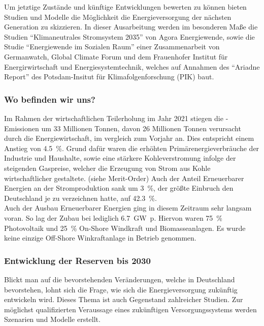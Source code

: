 		Um jetztige Zustände und künftige Entwicklungen bewerten zu können bieten Studien und Modelle die Möglichkeit die Energieversorgung der nächsten Generation zu skizzieren. In dieser Ausarbeitung werden im besonderen Maße die Studien "`Klimaneutrales Stromsystem 2035"' von Agora Energiewende, sowie die Studie "`Energiewende im Sozialen Raum"' einer Zusammenarbeit von Germanwatch, Global Climate Forum und dem Frauenhofer Institut für Energirwirtschaft und Energiesystemtechnik, welches auf Annahmen des "`Ariadne Report"' des Potsdam-Insitut für Klimafolgenforschung (PIK) baut.\\

		\subsubsection{Wo befinden wir uns?}
		Im Rahmen der wirtschaftlichen Teilerholung im Jahr 2021 stiegen die \SI{}{\COtwo}-Emissionen um 33 Millionen Tonnen, davon 26 Millionen Tonnen verursacht durch die Energiewirtschaft, im vergleich zum Vorjahr an. Dies entspricht einem Anstieg von \SI{4,5}{\percent}. Grund dafür waren die erhöhten Primärenergieverbräuche der Industrie und Haushalte, sowie eine stärkere Kohleverstromung infolge der steigenden Gaspreise, welcher die Erzeugung von Strom aus Kohle wirtschaftlicher gestaltete. (siehe Merit-Order) Auch der Anteil Erneuerbarer Energien an der Stromproduktion sank um \SI{3}{\percent}, der größte Einbruch den Deutschland je zu verzeichnen hatte, auf \SI{42,3}{\percent}.\\
		
		Auch der Ausbau Erneuerbarer Energien ging in diesem Zeitraum sehr langsam voran. So lag der Zubau bei lediglich \SI{6,7}{\giga \watt p}. Hiervon waren \SI{75}{\percent} Photovoltaik und \SI{25}{\percent} On-Shore Windkraft und Biomasseanlagen. Es wurde keine einzige Off-Shore Winkraftanlage in Betrieb genommen. 
		
		
		\subsubsection{Entwicklung der Reserven bis 2030} \label{sect: 2030}
		Blickt man auf die bevorstehenden Veränderungen, welche in Deutschland bevorstehen, lohnt sich die Frage, wie sich die Energieversorgung zukünftig entwickeln wird. Dieses Thema ist auch Gegenstand zahlreicher Studien. Zur möglichst qualifizierten Veraussage eines zukünftigen Versorgungssystems werden Szenarien und Modelle erstellt.\\
		
